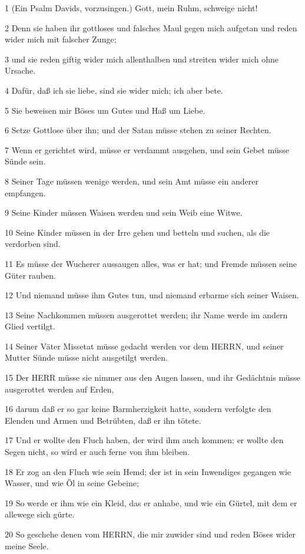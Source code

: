 \par 1 (Ein Psalm Davids, vorzusingen.) Gott, mein Ruhm, schweige nicht!
\par 2 Denn sie haben ihr gottloses und falsches Maul gegen mich aufgetan und reden wider mich mit falscher Zunge;
\par 3 und sie reden giftig wider mich allenthalben und streiten wider mich ohne Ursache.
\par 4 Dafür, daß ich sie liebe, sind sie wider mich; ich aber bete.
\par 5 Sie beweisen mir Böses um Gutes und Haß um Liebe.
\par 6 Setze Gottlose über ihn; und der Satan müsse stehen zu seiner Rechten.
\par 7 Wenn er gerichtet wird, müsse er verdammt ausgehen, und sein Gebet müsse Sünde sein.
\par 8 Seiner Tage müssen wenige werden, und sein Amt müsse ein anderer empfangen.
\par 9 Seine Kinder müssen Waisen werden und sein Weib eine Witwe.
\par 10 Seine Kinder müssen in der Irre gehen und betteln und suchen, als die verdorben sind.
\par 11 Es müsse der Wucherer aussaugen alles, was er hat; und Fremde müssen seine Güter rauben.
\par 12 Und niemand müsse ihm Gutes tun, und niemand erbarme sich seiner Waisen.
\par 13 Seine Nachkommen müssen ausgerottet werden; ihr Name werde im andern Glied vertilgt.
\par 14 Seiner Väter Missetat müsse gedacht werden vor dem HERRN, und seiner Mutter Sünde müsse nicht ausgetilgt werden.
\par 15 Der HERR müsse sie nimmer aus den Augen lassen, und ihr Gedächtnis müsse ausgerottet werden auf Erden,
\par 16 darum daß er so gar keine Barmherzigkeit hatte, sondern verfolgte den Elenden und Armen und Betrübten, daß er ihn tötete.
\par 17 Und er wollte den Fluch haben, der wird ihm auch kommen; er wollte den Segen nicht, so wird er auch ferne von ihm bleiben.
\par 18 Er zog an den Fluch wie sein Hemd; der ist in sein Inwendiges gegangen wie Wasser, und wie Öl in seine Gebeine;
\par 19 So werde er ihm wie ein Kleid, das er anhabe, und wie ein Gürtel, mit dem er allewege sich gürte.
\par 20 So geschehe denen vom HERRN, die mir zuwider sind und reden Böses wider meine Seele.
